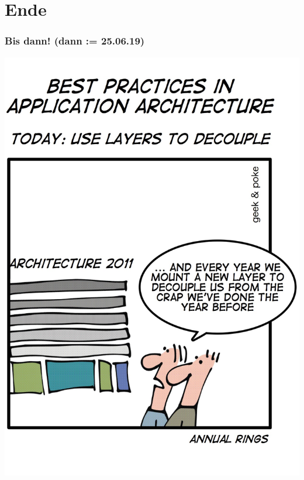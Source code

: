 \documentclass[18pt]{beamer}
\begin{document}
\section{Ende}	
	\begin{frame}
		\frametitle{Bis dann! (dann  := 25.06.19)}
		\centering
		\includegraphics[scale=0.55]{./comics/footprints2.jpg}
	\end{frame}
\end{document}
